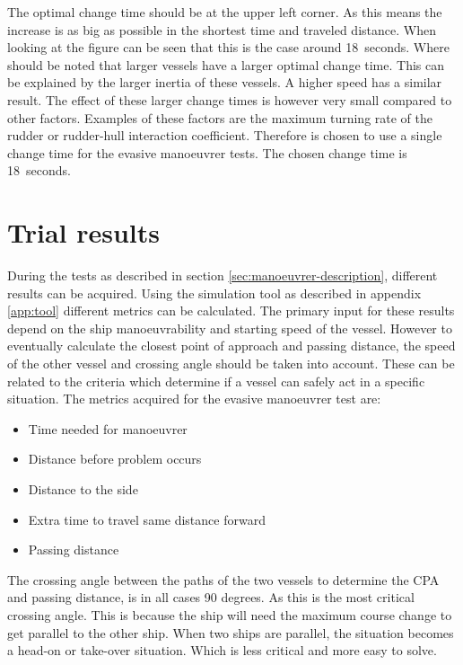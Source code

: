 The optimal change time should be at the upper left corner. As this means the increase is as big as possible in the shortest time and traveled distance. When looking at the figure can be seen that this is the case around 18~seconds. Where should be noted that larger vessels have a larger optimal change time. This can be explained by the larger inertia of these vessels. A higher speed has a similar result. The effect of these larger change times is however very small compared to other factors. Examples of these factors are the maximum  turning rate of the rudder or rudder-hull interaction coefficient. Therefore is chosen to use a single change time for the evasive manoeuvrer tests. The chosen change time is 18~seconds.

\afterpage{\clearpage}
\newpage

\section{Trial results}
During the tests as described in section \ref{sec:manoeuvrer-description}, different results can be acquired. Using the simulation tool as described in appendix \ref{app:tool} different metrics can be calculated. The primary input for these results depend on the ship manoeuvrability and starting speed of the vessel. However to eventually calculate the closest point of approach and passing distance, the speed of the other vessel and crossing angle should be taken into account.
These can be related to the criteria which determine if a vessel can safely act in a specific situation. The metrics acquired for the evasive manoeuvrer test are:
\begin{itemize}
	\item Time needed for manoeuvrer
	\item Distance before problem occurs
	\item Distance to the side
	\item Extra time to travel same distance forward
	\item Passing distance
\end{itemize}

The crossing angle between the paths of the two vessels to determine the CPA and passing distance, is in all cases 90 degrees. As this is the most critical crossing angle. This is because the ship will need the maximum course change to get parallel to the other ship. When two ships are parallel, the situation becomes a head-on or take-over situation. Which is less critical and more easy to solve. 

